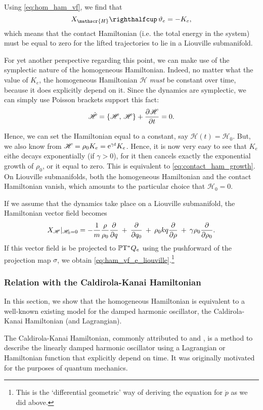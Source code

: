 Using \cref{eq:hom_ham_vf}, we find that 
$$ \intpr{X_\mathscr{H}}{\theta_e} = -K_e, $$
which means that the contact Hamiltonian (i.e. the total energy in the system)
must be equal to zero for the lifted trajectories to lie in a Liouville submanifold.

For yet another perspective regarding this point, we can make use of the symplectic nature of the homogeneous Hamiltonian. Indeed, no matter what the value of $K_e$, the homogeneous Hamiltonian $\mathscr{H}$ \emph{must} be constant over time, because it does explicitly depend on it. Since the dynamics are symplectic, we can simply use Poisson brackets support this fact:
$$ \dot{\mathscr{H}} = \qty{\mathscr{H},\,\mathscr{H}} + \pdv{\mathscr{H}}{t} = 0.$$

Hence, we can set the Hamiltonian equal to a constant, say $\mathscr{H}(t) = \mathscr{H}_0$. But, we also know from $\mathscr{H} = \rho_0 K_e = \mathrm{e}^{\gamma t} K_e$. Hence, it is now very easy to see that $K_e$ eithe  decays exponentially (if $\gamma > 0$), for it then cancels exactly the exponential growth of $\rho_0$, or it equal to zero. This is equivalent to \cref{eq:contact_ham_growth}. On Liouville submanifolds, both the homogeneous Hamiltonian and the contact Hamiltonian vanish, which amounts to the particular choice that $\mathscr{H}_0 = 0$.

If we assume that the dynamics take place on a Liouville submanifold, the Hamiltonian vector field becomes
$$ X_\mathscr{H}\vert_{\mathscr{H}_0 = 0} =  -\frac{1}{m}\frac{\rho}{\rho_0}\pdv{}{q}\: + \: \pdv{}{q_0}\: + \: \rho_0 kq \pdv{}{\rho}\: + \: \gamma \rho_0 \pdv{}{\rho_0}. $$
If this vector field is be projected to $\mathbb{P}\mathrm{T}^* Q_e$ using the pushforward of the projection map $\sigma$, we obtain \cref{eq:ham_vf_e_liouville}.\footnote{This is the `differential geometric' way of deriving the equation for $\dot{p}$ as we did above.}

\subsubsection{Relation with the Caldirola-Kanai Hamiltonian}
In this section, we show that the homogeneous Hamiltonian is equivalent to a well-known existing model for the damped harmonic oscillator, the Caldirola-Kanai Hamiltonian (and Lagrangian).

The Caldirola-Kanai Hamiltonian, commonly attributed to \citet{Caldirola1941} and \citet{Kanai1948}, is a method to describe the linearly damped harmonic oscillator using a Lagrangian or Hamiltonian function that explicitly depend on time. It was originally motivated for the purposes of quantum mechanics.

